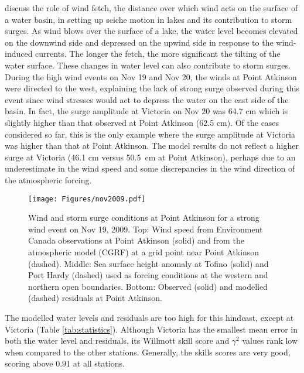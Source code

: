 \documentclass{tATO2e}
\begin{document}
\citet{danard2003storm} discuss the role of wind fetch, the distance over which wind acts on the surface of a water basin, in setting up seiche motion in lakes and its contribution to storm surges. As wind blows over the surface of a lake, the water level becomes elevated on the downwind side and depressed on the upwind side in response to the wind-induced currents. The longer the fetch, the more significant the tilting of the water surface. These changes in water level can also contribute to storm surges.  During the high wind events on Nov 19 and Nov 20, the winds at Point Atkinson were directed to the west, explaining the lack of strong surge observed during this event since wind stresses would act to depress the water on the east side of the basin. In fact, the surge amplitude at Victoria on Nov 20 was 64.7 cm which is slightly higher than that observed at Point Atkinson (62.5 cm). Of the cases considered so far, this is the only example where the surge amplitude at Victoria was higher than that at Point Atkinson. The model results do not reflect a higher surge at Victoria (46.1 cm versus 50.5~cm at Point Atkinson), perhaps due to an underestimate in the wind speed and some discrepancies in the wind direction of the atmospheric forcing.  


\begin{figure}
\centering
\texttt{[image: Figures/nov2009.pdf]}
\caption{Wind and storm surge conditions at Point Atkinson for a strong wind event on Nov 19, 2009. Top: Wind speed from Environment Canada observations \citep{ECClimateArchive} at Point Atkinson (solid) and from the atmospheric model (CGRF) at a grid point near Point Atkinson (dashed). Middle: Sea surface height anomaly at Tofino (solid) and Port Hardy (dashed) used as forcing conditions at the western and northern open boundaries. Bottom: Observed (solid) and modelled (dashed) residuals at Point Atkinson.  }
\label{fig:nov2009}
\end{figure}

The modelled water levels and residuals are too high for this hindcast, except at Victoria (Table \ref{tab:statistics}). Although Victoria has the smallest mean error in both the water level and residuals, its Willmott skill score and $\gamma^2$ values rank low when compared to the other stations. Generally, the skills scores are very good, scoring above 0.91 at all stations. 
\end{document}
